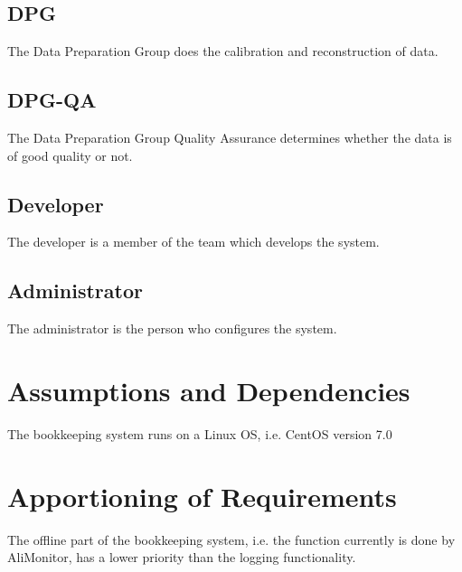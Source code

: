 \subsection{DPG}
The Data Preparation Group does the calibration and reconstruction of data.

\subsection{DPG-QA}
The Data Preparation Group Quality Assurance determines whether the data is of good quality or not.

\subsection{Developer}
The developer is a member of the team which develops the system. 

\subsection{Administrator}
The administrator is the person who configures the system.

\section{Assumptions and Dependencies}
The bookkeeping system runs on a Linux OS, i.e. CentOS version 7.0

\section{Apportioning of Requirements}
The offline part of the bookkeeping system, i.e. the function currently is done by AliMonitor, has a lower priority than the logging functionality.
